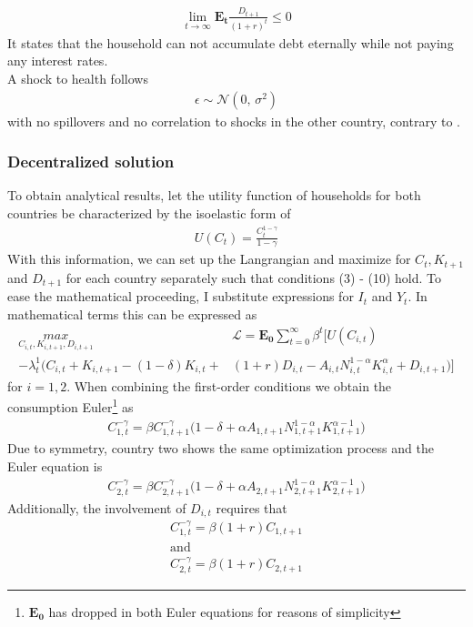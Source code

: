\documentclass{article}
\begin{document}
\begin{align}
\lim_{t \to \infty} \mathbf{E_t} \frac{D_{t+1}}{(1+r)^t} \leq 0
\end{align}
It states that the household can not accumulate debt eternally while not paying any interest rates. \\
A shock to health follows 
\begin{align}
\epsilon \sim \mathcal{N}(0,\,\sigma^{2})
\end{align} 
with no spillovers and no correlation to shocks in the other country, contrary to \cite{backus1992international}.

\subsubsection{Decentralized solution}

To obtain analytical results, let the utility function of households for both countries be characterized by the isoelastic form of
\begin{align}
U(C_t) = \frac{C_t^{1-\gamma}}{1-\gamma}
\end{align}
With this information, we can set up the Langrangian and maximize for $C_t, K_{t+1}$ and $D_{t+1}$ for each country separately such that conditions (3) - (10) hold. To ease the mathematical proceeding, I substitute expressions for $I_t$ and $Y_t$.
In mathematical terms this can be expressed as
\begin{align*}
\underset{C_{i, t}, K_{i, t+1}, D_{i, t+1}}{max} &\mathcal{L} = \mathbf{E_0} \sum_{t=0}^{\infty} \beta^t \Bigg[ U(C_{i, t}) \\ - \lambda_t^1 \Big( C_{i, t} + K_{i, t+1} - (1 - \delta)K_{i, t} + &(1+r)D_{i, t} - A_{i, t} N_{i, t}^{1-\alpha} K_{i, t}^{\alpha} + D_{i, t+1} \Big) \Bigg]
\end{align*}
for $i = 1,2$. When combining the first-order conditions we obtain the consumption Euler\footnote{$\mathbf{E_0}$ has dropped in both Euler equations for reasons of simplicity} as 
\begin{align}
C_{1, t}^{-\gamma} = \beta C_{1, t+1}^{-\gamma} \big( 1 - \delta + \alpha A_{1, t+1} N_{1, t+1}^{1 - \alpha} K_{1, t+1}^{\alpha -1} \big)
\end{align}
Due to symmetry, country two shows the same optimization process and the Euler equation is 
\begin{align}
C_{2, t}^{-\gamma} = \beta C_{2, t+1}^{-\gamma} \big( 1 - \delta + \alpha A_{2, t+1} N_{2, t+1}^{1 - \alpha} K_{2, t+1}^{\alpha -1} \big)
\end{align}
Additionally, the involvement of $D_{i, t}$ requires that
\begin{align}
C_{1, t}^{-\gamma} = \beta (1 + r) C_{1, t+1} \\ \text{and} \nonumber \\
C_{2, t}^{-\gamma} = \beta (1 + r) C_{2, t+1}
\end{align}
\end{document}
